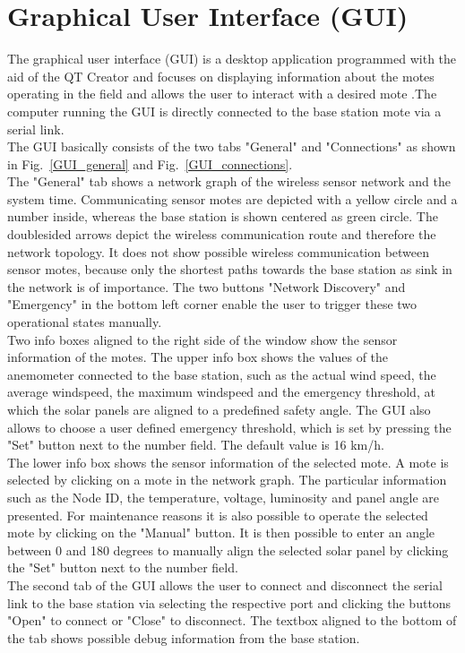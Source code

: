 \documentclass[conference]{IEEEtran}
\begin{document}
\section{Graphical User Interface (GUI)}
The graphical user interface (GUI) is a desktop application programmed with the aid of the QT Creator and focuses on displaying information about the motes operating in the field and allows the user to interact with a desired mote .The computer running the GUI is directly connected to the base station mote via a serial link.\\
The GUI basically consists of the two tabs "General" and "Connections" as shown in Fig.~\ref{GUI_general} and Fig.~\ref{GUI_connections}.\\
The "General" tab shows a network graph of the wireless sensor network and the system time. Communicating sensor motes are depicted with a yellow circle and a number inside, whereas the base station is shown centered as green circle. The doublesided arrows depict the wireless communication route and therefore the network topology. It does not show possible wireless communication between sensor motes, because only the shortest paths towards the base station as sink in the network is of importance.
The two buttons "Network Discovery" and "Emergency" in the bottom left corner enable the user to trigger these two operational states manually.\\
Two info boxes aligned to the right side of the window show the sensor information of the motes. The upper info box shows the values of the anemometer connected to the base station, such as the actual wind speed, the average windspeed, the maximum windspeed and the emergency threshold, at which the solar panels are aligned to a predefined safety angle. The GUI also allows to choose a user defined emergency threshold, which is set by pressing the "Set" button next to the number field. The default value is 16 km/h.\\
The lower info box shows the sensor information of the selected mote. A mote is selected by clicking on a mote in the network graph. The particular information such as the Node ID, the temperature, voltage, luminosity and panel angle are presented. For maintenance reasons it is also possible to operate the selected mote by clicking on the "Manual" button. It is then possible to enter an angle between 0 and 180 degrees to manually align the selected solar panel by clicking the "Set" button next to the number field.\\
The second tab of the GUI allows the user to connect and disconnect the serial link to the base station via selecting the respective port and clicking the buttons "Open" to connect or "Close" to disconnect. The textbox aligned to the bottom of the tab shows possible debug information from the base station.
\end{document}
